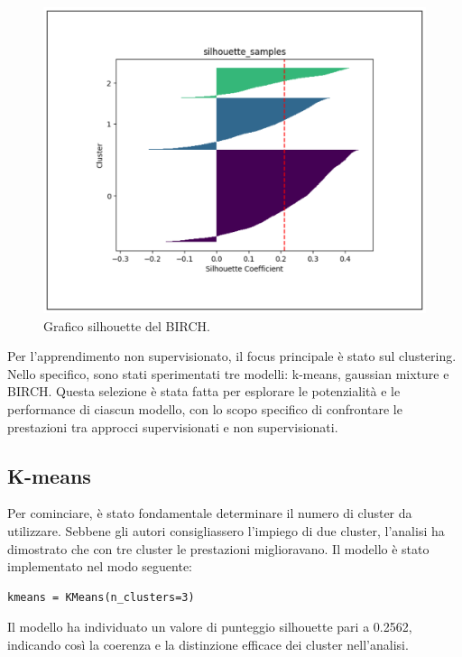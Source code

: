 \begin{figure}[t]
\begin{multicols}{3}
        \includegraphics[width=\linewidth]{img//6/8.png}
        \caption{Grafico silhouette del BIRCH.}
        \label{fig:6-8}
    \end{multicols}
\end{figure}

Per l'apprendimento non supervisionato, il focus principale è stato sul clustering. Nello specifico, sono stati sperimentati tre modelli: k-means, gaussian mixture e BIRCH. Questa selezione è stata fatta per esplorare le potenzialità e le performance di ciascun modello, con lo scopo specifico di confrontare le prestazioni tra approcci supervisionati e non supervisionati.

\subsection{K-means}

Per cominciare, è stato fondamentale determinare il numero di cluster da utilizzare. Sebbene gli autori \cite{iqbal2022exploring} consigliassero l'impiego di due cluster, l'analisi ha dimostrato che con tre cluster le prestazioni miglioravano. Il modello è stato implementato nel modo seguente:

\bigskip

\begin{lstlisting}
kmeans = KMeans(n_clusters=3)
\end{lstlisting}

\bigskip

Il modello ha individuato un valore di punteggio silhouette pari a 0.2562, indicando così la coerenza e la distinzione efficace dei cluster nell'analisi.

